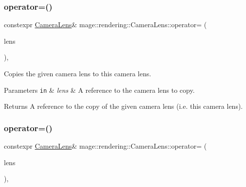 \subsubsection{\texorpdfstring{operator=()}{operator=()}\hspace{0.1cm}{\footnotesize\ttfamily [1/2]}}
{\footnotesize\ttfamily constexpr \hyperlink{classmage_1_1rendering_1_1_camera_lens}{Camera\+Lens}\& mage\+::rendering\+::\+Camera\+Lens\+::operator= (\begin{DoxyParamCaption}\item[{const \hyperlink{classmage_1_1rendering_1_1_camera_lens}{Camera\+Lens} \&}]{lens }\end{DoxyParamCaption})\hspace{0.3cm}{\ttfamily [default]}, {\ttfamily [noexcept]}}

Copies the given camera lens to this camera lens.


\begin{DoxyParams}[1]{Parameters}
\mbox{\tt in}  & {\em lens} & A reference to the camera lens to copy. \\
\hline
\end{DoxyParams}
\begin{DoxyReturn}{Returns}
A reference to the copy of the given camera lens (i.\+e. this camera lens). 
\end{DoxyReturn}
\hypertarget{classmage_1_1rendering_1_1_camera_lens_af2c0c0b55951ecec1aa96d452960fe3f}{}\label{classmage_1_1rendering_1_1_camera_lens_af2c0c0b55951ecec1aa96d452960fe3f} 
\subsubsection{\texorpdfstring{operator=()}{operator=()}\hspace{0.1cm}{\footnotesize\ttfamily [2/2]}}
{\footnotesize\ttfamily constexpr \hyperlink{classmage_1_1rendering_1_1_camera_lens}{Camera\+Lens}\& mage\+::rendering\+::\+Camera\+Lens\+::operator= (\begin{DoxyParamCaption}\item[{\hyperlink{classmage_1_1rendering_1_1_camera_lens}{Camera\+Lens} \&\&}]{lens }\end{DoxyParamCaption})\hspace{0.3cm}{\ttfamily [default]}, {\ttfamily [noexcept]}}

